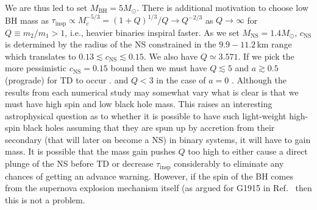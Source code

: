 \documentclass[amsmath,amssymb,aps,floats,amsfonts,notitlepage,superscriptaddress,eqsecnum,nofootinbib,10pt]{revtex4-1}
\begin{document}
%
We are thus led to set $M_\text{BH} =5 M_\odot$. There is additional motivation to choose low BH mass as 
 $\tau_\text{insp} \propto M_c^{-5/3} = (1+Q)^{1/3}/Q\to Q^{-2/3}$ as $Q\to\infty$ for $Q\equiv m_2/m_1 > 1$, i.e., heavier binaries inspiral faster.
 As we set $M_\text{NS}=1.4 M_\odot$, $c_\text{NS}$ is determined by the radius of the NS constrained in the $9.9 - 11.2\,$km range \cite{Ozel:2016oaf}
 which translates to $0.13\lesssim c_\text{NS} \lesssim 0.15$. We also have $Q  \simeq 3.571$.
If we pick the more pessimistic $c_\text{NS} = 0.15$ bound then we must have $Q\lesssim 5$ and $a\gtrsim 0.5$ (prograde) for TD to occur \cite{Ferrari:2008nr}.
and $Q< 3$ in the case of $a=0$ \cite{Kyutoku:2011vz}.
Although the results from each numerical study may somewhat vary what is clear is that we must have high spin and low black hole mass.
This raises an interesting astrophysical question as to whether it is possible to have such light-weight high-spin black holes assuming that
they are spun up by accretion from their secondary (that will later on become a NS) in binary systems, it will have to gain mass.
It is possible that the mass gain pushes $Q$ too high to either cause a direct plunge of the NS before TD or decrease $\tau_\text{insp}$ considerably
to eliminate any chances of getting an advance warning.
However, if the spin of the BH comes from the supernova explosion mechanism itself (as argued for G1915 in Ref.~\cite{McClintock:2006xd} then this is not a problem. 
\end{document}
